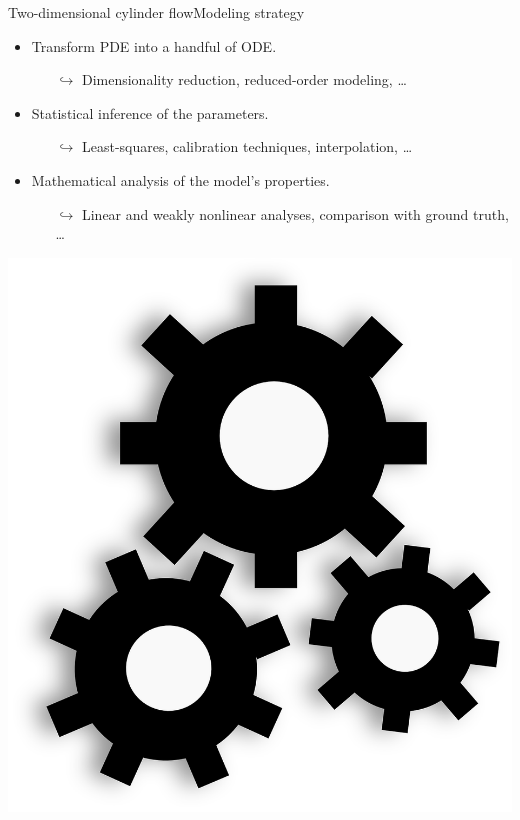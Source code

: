 \documentclass[usenames,dvipsnames,svgnames,10pt,aspectratio=169]{beamer}
\begin{document}
\begin{frame}[t, c]{Two-dimensional cylinder flow}{Modeling strategy}
  \begin{minipage}{.68\textwidth}
    \begin{itemize}
    \item Transform PDE into a handful of ODE.
      \begin{itemize}
      \item[$\hookrightarrow$] Dimensionality reduction, reduced-order modeling, \ldots
      \end{itemize}

      \medskip

    \item Statistical inference of the parameters.
      \begin{itemize}
      \item[$\hookrightarrow$] Least-squares, calibration techniques, interpolation, \ldots
      \end{itemize}

      \medskip

    \item Mathematical analysis of the model's properties.
      \begin{itemize}
      \item[$\hookrightarrow$] Linear and weakly nonlinear analyses, comparison with ground truth, \ldots
      \end{itemize}
    \end{itemize}
  \end{minipage}%
  \hfill
  \begin{minipage}{.28\textwidth}
    \centering
    \includegraphics[width=\textwidth]{Gears}
  \end{minipage}

  \vspace{1cm}
\end{frame}
\end{document}
